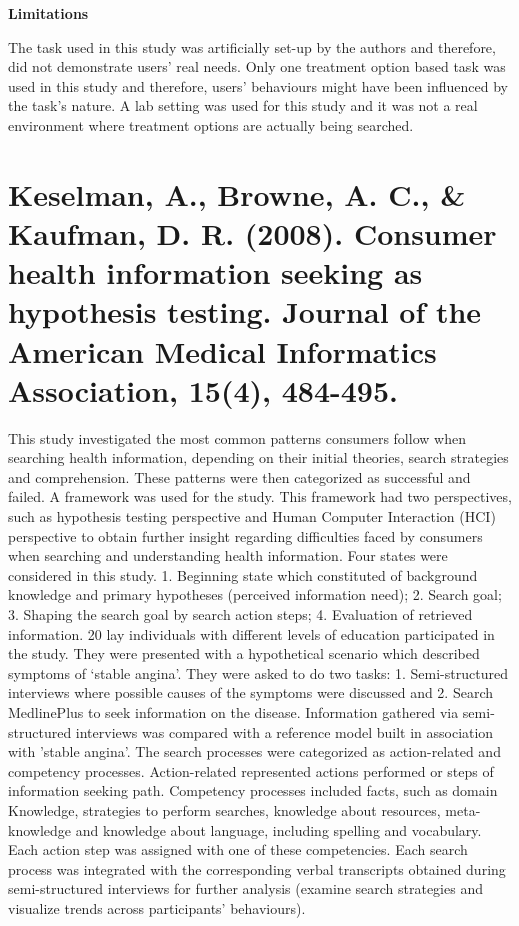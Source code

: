 \documentclass[]{article}
\begin{document}
\textbf{Limitations}

The task used in this study was artificially set-up by the authors and therefore, did not demonstrate users' real needs. Only one treatment option based task was used in this study and therefore, users' behaviours might have been influenced by the task's nature. A lab setting was used for this study and it was not a real environment where treatment options are actually being searched.  

\section{Keselman, A., Browne, A. C., \& Kaufman, D. R. (2008). Consumer health information seeking as hypothesis testing. Journal of the American Medical Informatics Association, 15(4), 484-495.} 

This study investigated the most common patterns consumers follow when searching health information, depending on their initial theories, search strategies and comprehension. These patterns were then categorized as successful and failed. A framework was used for the study. This framework had two perspectives, such as hypothesis testing perspective and Human Computer Interaction (HCI) perspective to obtain further insight regarding difficulties faced by consumers when searching and understanding health information. Four states were considered in this study. 1. Beginning state which constituted of background knowledge and primary hypotheses (perceived information need); 2. Search goal; 3. Shaping the search goal by search action steps; 4. Evaluation of retrieved information. 20 lay individuals with different levels of education participated in the study. They were presented with a hypothetical scenario which described symptoms of ‘stable angina’. They were asked to do two tasks: 1. Semi-structured interviews where possible causes of the symptoms were discussed and 2. Search MedlinePlus to seek information on the disease. Information gathered via semi-structured interviews was compared with a reference model built in association with 'stable angina'. The search processes were categorized as action-related and competency processes. Action-related represented actions performed or steps of information seeking path. Competency processes included facts, such as domain Knowledge, strategies to perform searches, knowledge about resources, meta-knowledge and knowledge about language, including spelling and vocabulary. Each action step was assigned with one of these competencies. Each search process was integrated with the corresponding verbal transcripts obtained during semi-structured interviews for further analysis (examine search strategies and visualize trends across participants’ behaviours). 
\end{document}
